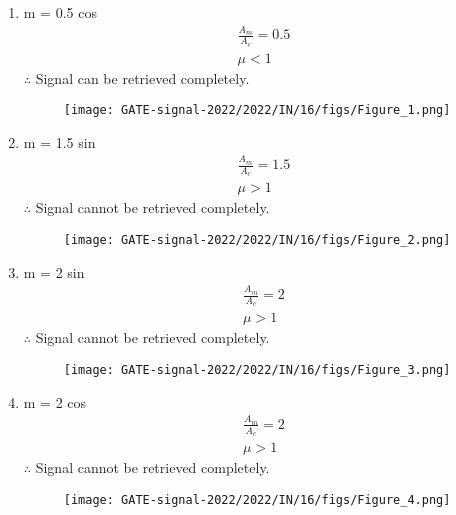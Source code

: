 \documentclass[journal,12pt,twocolumn]{IEEEtran}
\theoremstyle{remark}
\begin{document}
\begin{enumerate}

    \item m = 0.5 cos 
\begin{align}
    \frac{A_m}{A_c}= 0.5 \\
    \mu <1
\end{align}
$\therefore$ Signal can be retrieved completely.
\renewcommand{\thefigure}{\theenumi}
 \renewcommand{\thetable}{\theenumi}
\begin{figure}[h]
  
  \texttt{[image: GATE-signal-2022/2022/IN/16/figs/Figure\_1.png]}
  
\end{figure}
\item m = 1.5 sin 
\begin{align}
    \frac{A_m}{A_c}= 1.5\\
    \mu >1
\end{align}
$\therefore$ Signal cannot be retrieved completely.
\renewcommand{\thefigure}{\theenumi}
 \renewcommand{\thetable}{\theenumi}
\begin{figure}[h]
  
  \texttt{[image: GATE-signal-2022/2022/IN/16/figs/Figure\_2.png]}
  
\end{figure}
\item m = 2 sin 
\begin{align}
    \frac{A_m}{A_c}= 2\\
    \mu >1
\end{align}
$\therefore$ Signal cannot be retrieved completely.
\renewcommand{\thefigure}{\theenumi}
 \renewcommand{\thetable}{\theenumi}
\begin{figure}[h]
  
  \texttt{[image: GATE-signal-2022/2022/IN/16/figs/Figure\_3.png]}
  
\end{figure}
\item m = 2 cos 
\begin{align}
    \frac{A_m}{A_c}= 2\\
    \mu > 1
\end{align}
$\therefore$ Signal cannot be retrieved completely.
\renewcommand{\thefigure}{\theenumi}
 \renewcommand{\thetable}{\theenumi}
\begin{figure}[h]
  
  \texttt{[image: GATE-signal-2022/2022/IN/16/figs/Figure\_4.png]}
  
\end{figure}
\end{enumerate}
 
\end{document}
